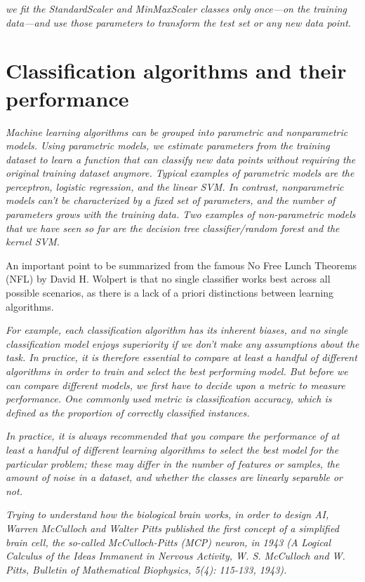\textit{we fit the StandardScaler and MinMaxScaler classes only once—on the training data—and use those parameters to transform the test set or any new data point.}

\section{Classification algorithms and their performance} \label{sec:classification_algorithms_performance}

\textit{Machine learning algorithms can be grouped into parametric and nonparametric models. Using parametric models, we estimate parameters from the training dataset to learn a function that can classify new data points without requiring the original training dataset anymore. Typical examples of parametric models are the perceptron, logistic regression, and the linear SVM. In contrast, nonparametric models can't be characterized by a fixed set of parameters, and the number of parameters grows with the training data. Two examples of non-parametric models that we have seen so far are the decision tree classifier/random forest and the kernel SVM.}

An important point to be summarized from the famous No Free Lunch Theorems (NFL)\cite{Wolpert1996,Wolpert1997} by David H. Wolpert is that no single classifier works best across all possible scenarios, as there is a lack of a priori distinctions between learning algorithms.

\textit{For example, each classification algorithm has its inherent biases, and no single classification model enjoys superiority if we don't make any assumptions about the task. In practice, it is therefore essential to compare at least a handful of different algorithms in order to train and select the best performing model. But before we can compare different models, we first have to decide upon a metric to measure performance. One commonly used metric is classification accuracy, which is defined as the proportion of correctly classified instances.}

\textit{In practice, it is always recommended that you compare the performance of at least a handful of different learning algorithms to select the best model for the particular problem; these may differ in the number of features or samples, the amount of noise in a dataset, and whether the classes are linearly separable or not.}

\textit{Trying to understand how the biological brain works, in order to design AI, Warren McCulloch and Walter Pitts published the first concept of a simplified brain cell, the so-called McCulloch-Pitts (MCP) neuron, in 1943 (A Logical Calculus of the Ideas Immanent in Nervous Activity, W. S. McCulloch and W. Pitts, Bulletin of Mathematical Biophysics, 5(4): 115-133, 1943).}

